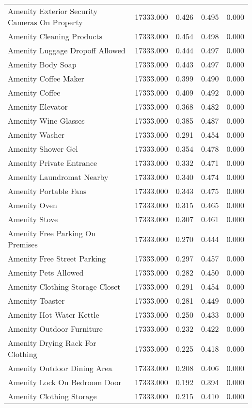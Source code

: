 \begin{tabular}{lllll}
Amenity Exterior Security Cameras On Property & 17333.000 & 0.426 & 0.495 & 0.000 \\
Amenity Cleaning Products & 17333.000 & 0.454 & 0.498 & 0.000 \\
Amenity Luggage Dropoff Allowed & 17333.000 & 0.444 & 0.497 & 0.000 \\
Amenity Body Soap & 17333.000 & 0.443 & 0.497 & 0.000 \\
Amenity Coffee Maker & 17333.000 & 0.399 & 0.490 & 0.000 \\
Amenity Coffee & 17333.000 & 0.409 & 0.492 & 0.000 \\
Amenity Elevator & 17333.000 & 0.368 & 0.482 & 0.000 \\
Amenity Wine Glasses & 17333.000 & 0.385 & 0.487 & 0.000 \\
Amenity Washer & 17333.000 & 0.291 & 0.454 & 0.000 \\
Amenity Shower Gel & 17333.000 & 0.354 & 0.478 & 0.000 \\
Amenity Private Entrance & 17333.000 & 0.332 & 0.471 & 0.000 \\
Amenity Laundromat Nearby & 17333.000 & 0.340 & 0.474 & 0.000 \\
Amenity Portable Fans & 17333.000 & 0.343 & 0.475 & 0.000 \\
Amenity Oven & 17333.000 & 0.315 & 0.465 & 0.000 \\
Amenity Stove & 17333.000 & 0.307 & 0.461 & 0.000 \\
Amenity Free Parking On Premises & 17333.000 & 0.270 & 0.444 & 0.000 \\
Amenity Free Street Parking & 17333.000 & 0.297 & 0.457 & 0.000 \\
Amenity Pets Allowed & 17333.000 & 0.282 & 0.450 & 0.000 \\
Amenity Clothing Storage Closet & 17333.000 & 0.291 & 0.454 & 0.000 \\
Amenity Toaster & 17333.000 & 0.281 & 0.449 & 0.000 \\
Amenity Hot Water Kettle & 17333.000 & 0.250 & 0.433 & 0.000 \\
Amenity Outdoor Furniture & 17333.000 & 0.232 & 0.422 & 0.000 \\
Amenity Drying Rack For Clothing & 17333.000 & 0.225 & 0.418 & 0.000 \\
Amenity Outdoor Dining Area & 17333.000 & 0.208 & 0.406 & 0.000 \\
Amenity Lock On Bedroom Door & 17333.000 & 0.192 & 0.394 & 0.000 \\
Amenity Clothing Storage & 17333.000 & 0.215 & 0.410 & 0.000 \\

\end{tabular}
